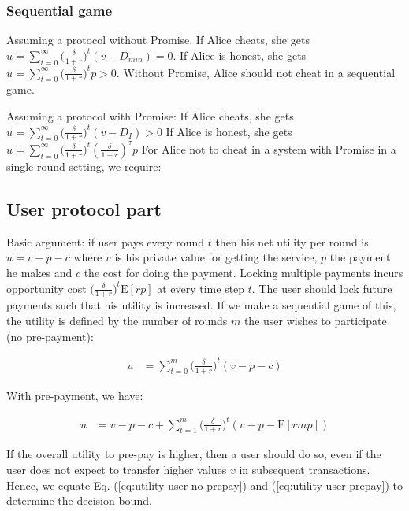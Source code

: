 \documentclass[runningheads]{llncs}
\newcommand{\sys}{Promise\xspace}
\begin{document}
\subsubsection{Sequential game}
Assuming a protocol without \sys.
If Alice cheats, she gets $u = \sum_{t=0}^{\infty} \big( \frac{\delta}{1+r} \big)^{t} (v - D_{min}) = 0$.
If Alice is honest, she gets $u = \sum_{t=0}^{\infty} \big( \frac{\delta}{1+r} \big)^{t} p > 0$.
Without \sys, Alice should not cheat in a sequential game.

Assuming a protocol with \sys:
If Alice cheats, she gets $u = \sum_{t=0}^{\infty} \big( \frac{\delta}{1+r} \big)^{t} (v - D_{I}) > 0$
If Alice is honest, she gets $u = \sum_{t=0}^{\infty} \big( \frac{\delta}{1+r} \big)^{t} (\frac{\delta}{1+r})^{\tau} p$
For Alice not to cheat in a system with \sys in a single-round setting, we require:



\subsection{User protocol part}
Basic argument:
if user pays every round $t$ then his net utility per round is $u = v - p - c$ where $v$ is his private value for getting the service, $p$ the payment he makes and $c$ the cost for doing the payment.
Locking multiple payments incurs opportunity cost $\big( \frac{\delta}{1+r} \big)^t \mathrm{E}[rp]$ at every time step $t$.
The user should lock future payments such that his utility is increased.
If we make a sequential game of this, the utility is defined by the number of rounds $m$ the user wishes to participate (no pre-payment):

\begin{align}
\label{eq:utility-user-no-prepay}
    u &= \sum_{t=0}^{m} \big( \frac{\delta}{1+r} \big)^t (v - p - c)
\end{align}

With pre-payment, we have:

\begin{align}
\label{eq:utility-user-prepay}
    u &= v - p - c + \sum_{t=1}^{m} \big( \frac{\delta}{1+r} \big)^t (v - p - \mathrm{E}[rmp])
\end{align}

If the overall utility to pre-pay is higher, then a user should do so, even if the user does not expect to transfer higher values $v$ in subsequent transactions.
Hence, we equate Eq. (\ref{eq:utility-user-no-prepay}) and (\ref{eq:utility-user-prepay}) to determine the decision bound.
\end{document}
